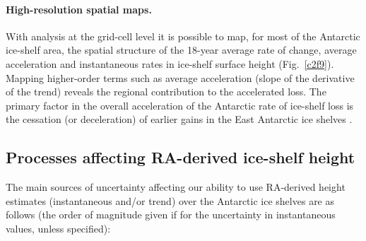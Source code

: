 \paragraph{High-resolution spatial maps.} With analysis at the grid-cell level it is possible to map, for most of the Antarctic ice-shelf area, the spatial structure of the 18-year average rate of change, average acceleration and instantaneous rates in ice-shelf surface height (Fig.~\ref{c2f9}). Mapping higher-order terms such as average acceleration (slope of the derivative of the trend) reveals the regional contribution to the accelerated loss. The primary factor in the overall acceleration of the Antarctic rate of ice-shelf loss is the cessation (or deceleration) of earlier gains in the East Antarctic ice shelves \parencite{Paolo2015}.


\subsection{Processes affecting RA-derived ice-shelf height}

The main sources of uncertainty affecting our ability to use RA-derived height estimates (instantaneous and/or trend) over the Antarctic ice shelves are as follows (the order of magnitude given if for the uncertainty in instantaneous values, unless specified):

